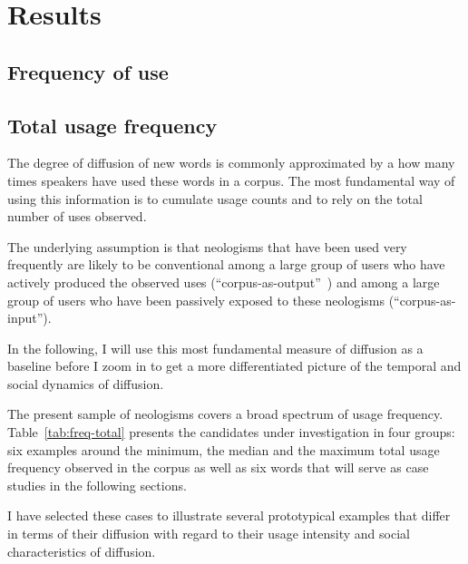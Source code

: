\documentclass[
  a4paper,
  abstract=on,
  captions=tableabove
  ]{scrartcl}
\begin{document}
\section{Results}
  \label{sec:results}

  \subsection{Frequency of use}
    \label{subsec:freq}

    \subsection{Total usage frequency}
      \label{subsec:total-freq}

  The degree of diffusion of new words is commonly approximated by a how many times speakers have used these words in a corpus. The most fundamental way of using this information is to cumulate usage counts and to rely on the total number of uses observed.

  The underlying assumption is that neologisms that have been used very frequently are likely to be conventional among a large group of users who have actively produced the observed uses (\enquote{corpus-as-output}~\parencite{Stefanowitsch2017CorpusbasedPerspective}) and among a large group of users who have been passively exposed to these neologisms (\enquote{corpus-as-input}).

  In the following, I will use this most fundamental measure of diffusion as a baseline before I zoom in to get a more differentiated picture of the temporal and social dynamics of diffusion.

  The present sample of neologisms covers a broad spectrum of usage frequency. Table~\ref{tab:freq-total} presents the candidates under investigation in four groups: six examples around the minimum, the median and the maximum total usage frequency observed in the corpus as well as six words that will serve as case studies in the following sections.

  I have selected these cases to illustrate several prototypical examples that differ in terms of their diffusion with regard to their usage intensity and social characteristics of diffusion.
\end{document}
